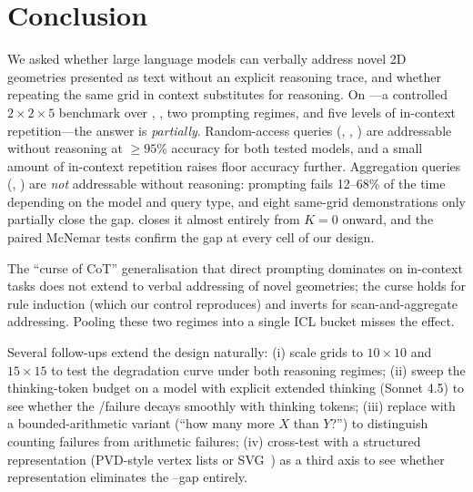 \section{Conclusion}
\label{sec:conclusion}

We asked whether large language models can verbally address novel 2D
geometries presented as text without an explicit reasoning trace, and
whether repeating the same grid in context substitutes for reasoning.
On \addrtask---a controlled $2{\times}2{\times}5$ benchmark over
\gpt, \haiku, two prompting regimes, and five levels of in-context
repetition---the answer is \emph{partially}. Random-access queries
(\qpoint, \qlookup, \qneighbor) are addressable without reasoning at
$\ge 95\%$ accuracy for both tested models, and a small amount of
in-context repetition raises floor accuracy further. Aggregation
queries (\qcount, \qrowmax) are \emph{not} addressable without
reasoning: \Direct prompting fails 12--68\% of the time depending on
the model and query type, and eight same-grid demonstrations only
partially close the gap. \COT closes it almost entirely from $K{=}0$
onward, and the paired McNemar tests confirm the gap at every cell of
our design.

The ``curse of CoT'' generalisation that direct prompting dominates
on in-context tasks does not extend to verbal addressing of novel
geometries; the curse holds for rule induction (which our \miniarc
control reproduces) and inverts for scan-and-aggregate addressing.
Pooling these two regimes into a single ICL bucket misses the effect.

Several follow-ups extend the design naturally:
(i) scale grids to $10{\times}10$ and $15{\times}15$ to test the
\citet{bai2025matrix} degradation curve under both reasoning regimes;
(ii) sweep the thinking-token budget on a model with explicit
extended thinking (\eg Sonnet 4.5) to see whether the
\qcount/\qrowmax failure decays smoothly with thinking tokens;
(iii) replace \qcount with a bounded-arithmetic variant
(``how many more $X$ than $Y$?'') to distinguish counting failures
from arithmetic failures;
(iv) cross-test with a structured representation (PVD-style vertex
lists or SVG~\citep{wang2025vdlm}) as a third axis to see whether
representation eliminates the \Direct--\COT gap entirely.
